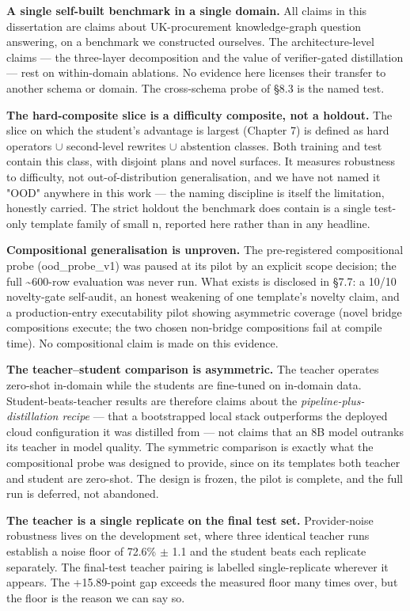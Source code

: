 \textbf{A single self-built benchmark in a single domain.} All claims in this dissertation are claims about UK-procurement knowledge-graph question answering, on a benchmark we constructed ourselves. The architecture-level claims --- the three-layer decomposition and the value of verifier-gated distillation --- rest on within-domain ablations. No evidence here licenses their transfer to another schema or domain. The cross-schema probe of \S8.3 is the named test.

\textbf{The hard-composite slice is a difficulty composite, not a holdout.} The slice on which the student's advantage is largest (Chapter 7) is defined as hard operators $\cup$ second-level rewrites $\cup$ abstention classes. Both training and test contain this class, with disjoint plans and novel surfaces. It measures robustness to difficulty, not out-of-distribution generalisation, and we have not named it "OOD" anywhere in this work --- the naming discipline is itself the limitation, honestly carried. The strict holdout the benchmark does contain is a single test-only template family of small n, reported here rather than in any headline.

\textbf{Compositional generalisation is unproven.} The pre-registered compositional probe (ood\_probe\_v1) was paused at its pilot by an explicit scope decision; the full \textasciitilde{}600-row evaluation was never run. What exists is disclosed in \S7.7: a 10/10 novelty-gate self-audit, an honest weakening of one template's novelty claim, and a production-entry executability pilot showing asymmetric coverage (novel bridge compositions execute; the two chosen non-bridge compositions fail at compile time). No compositional claim is made on this evidence.

\textbf{The teacher--student comparison is asymmetric.} The teacher operates zero-shot in-domain while the students are fine-tuned on in-domain data. Student-beats-teacher results are therefore claims about the \emph{pipeline-plus-distillation recipe} --- that a bootstrapped local stack outperforms the deployed cloud configuration it was distilled from --- not claims that an 8B model outranks its teacher in model quality. The symmetric comparison is exactly what the compositional probe was designed to provide, since on its templates both teacher and student are zero-shot. The design is frozen, the pilot is complete, and the full run is deferred, not abandoned.

\textbf{The teacher is a single replicate on the final test set.} Provider-noise robustness lives on the development set, where three identical teacher runs establish a noise floor of 72.6\% $\pm$ 1.1 and the student beats each replicate separately. The final-test teacher pairing is labelled single-replicate wherever it appears. The +15.89-point gap exceeds the measured floor many times over, but the floor is the reason we can say so.

